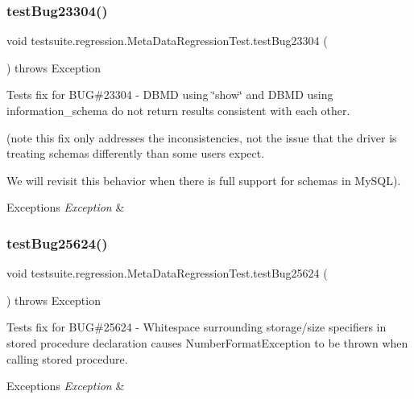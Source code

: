 \subsubsection{\texorpdfstring{test\+Bug23304()}{testBug23304()}}
{\footnotesize\ttfamily void testsuite.\+regression.\+Meta\+Data\+Regression\+Test.\+test\+Bug23304 (\begin{DoxyParamCaption}{ }\end{DoxyParamCaption}) throws Exception}

Tests fix for B\+UG\#23304 -\/ D\+B\+MD using \char`\"{}show\char`\"{} and D\+B\+MD using information\+\_\+schema do not return results consistent with each other.

(note this fix only addresses the inconsistencies, not the issue that the driver is treating schemas differently than some users expect.

We will revisit this behavior when there is full support for schemas in My\+S\+QL).


\begin{DoxyExceptions}{Exceptions}
{\em Exception} & \\
\hline
\end{DoxyExceptions}
\mbox{\label{classtestsuite_1_1regression_1_1_meta_data_regression_test_a2a97b03d5a86fcd988e7648006a385a6}} 
\subsubsection{\texorpdfstring{test\+Bug25624()}{testBug25624()}}
{\footnotesize\ttfamily void testsuite.\+regression.\+Meta\+Data\+Regression\+Test.\+test\+Bug25624 (\begin{DoxyParamCaption}{ }\end{DoxyParamCaption}) throws Exception}

Tests fix for B\+UG\#25624 -\/ Whitespace surrounding storage/size specifiers in stored procedure declaration causes Number\+Format\+Exception to be thrown when calling stored procedure.


\begin{DoxyExceptions}{Exceptions}
{\em Exception} & \\
\hline
\end{DoxyExceptions}
\mbox{\label{classtestsuite_1_1regression_1_1_meta_data_regression_test_a2b9dcc0e397f42daa33e068203ec5277}} 
